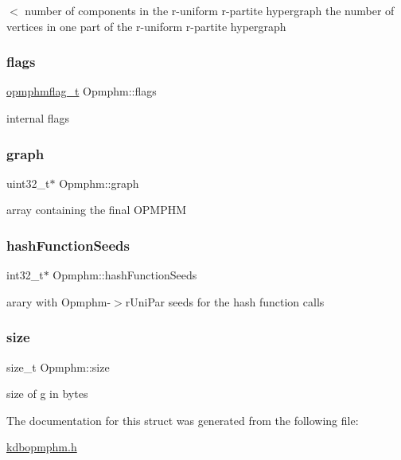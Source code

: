 $<$ number of components in the r-\/uniform r-\/partite hypergraph the number of vertices in one part of the r-\/uniform r-\/partite hypergraph \mbox{\label{structOpmphm_af321bfb7ed0bd9fc2c62a4b07568e3c6}} 
\subsubsection{\texorpdfstring{flags}{flags}}
{\footnotesize\ttfamily \mbox{\hyperlink{kdbopmphm_8h_a2485eafcb5c3e235f15e91d98ec39eef}{opmphmflag\+\_\+t}} Opmphm\+::flags}

internal flags \mbox{\label{structOpmphm_a9346a5fabe0c3a96abd70bb18cbd7fa2}} 
\subsubsection{\texorpdfstring{graph}{graph}}
{\footnotesize\ttfamily uint32\+\_\+t$\ast$ Opmphm\+::graph}

array containing the final O\+P\+M\+P\+HM \mbox{\label{structOpmphm_a522b3ab16ceb22828b54333868c9324d}} 
\subsubsection{\texorpdfstring{hashFunctionSeeds}{hashFunctionSeeds}}
{\footnotesize\ttfamily int32\+\_\+t$\ast$ Opmphm\+::hash\+Function\+Seeds}

arary with Opmphm-\/$>$r\+Uni\+Par seeds for the hash function calls \mbox{\label{structOpmphm_a72e7343b4ea87b27891e760f03fd2b96}} 
\subsubsection{\texorpdfstring{size}{size}}
{\footnotesize\ttfamily size\+\_\+t Opmphm\+::size}

size of g in bytes 

The documentation for this struct was generated from the following file\+:\begin{DoxyCompactItemize}
\item 
\mbox{\hyperlink{kdbopmphm_8h}{kdbopmphm.\+h}}\end{DoxyCompactItemize}
